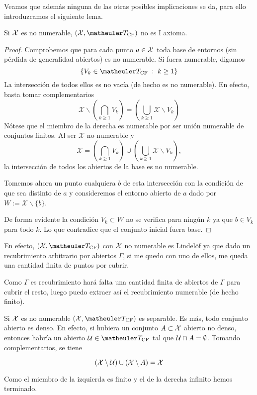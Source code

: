Veamos que además ninguna de las otras posibles implicaciones se da, para ello introduzcamos el siguiente lema.
\begin{lem}[I axioma]
	Si $\mathcal{X}$ es no numerable, $(\X,\T_{\mathrm{CF}})$ no es I axioma.
\end{lem}
\begin{proof}
	Comprobemos que para cada punto $a\in \mathcal{X}$ toda base de entornos (sin pérdida de generalidad abiertos) es no numerable. Si fuera numerable, digamos 
	\[\{V_k \in\T_{\text{CF}}\midc k \geq 1\}\]
	La intersección de todos ellos es no vacía (de hecho es no numerable). En efecto, basta tomar complementarios
	\[\mathcal{X} \backslash \left(\bigcap_{k\geq 1} V_k\right)= \left(\bigcup_{k\geq 1} \mathcal{X} \backslash V_k\right)\]
	Nótese que el miembro de la derecha es numerable por ser unión numerable de conjuntos finitos. Al ser $\mathcal{X}$ no numerable y 
	\[\mathcal{X}= \left(\bigcap_{k\geq 1} V_k\right) \cup \left(\bigcup_{k\geq 1} \mathcal{X}\backslash V_k\right),\]
	la intersección de todos los abiertos de la base es no numerable.
	
	Tomemos ahora un punto cualquiera $b$ de esta intersección con la condición de que sea distinto de $a$ y consideremos el entorno abierto de $a$ dado por $W:=\mathcal{X}\backslash \{b\}$.
	
	De forma evidente la condición $V_k \subset W$ no se verifica para ningún $k$ ya que $b\in V_k$ para todo $k$. Lo que contradice que el conjunto inicial fuera base.
\end{proof}
\begin{obs}
	En efecto, $(\X,\T_{\text{CF}})$ con $\mathcal{X}$ no numerable es Lindelöf ya que dado un recubrimiento arbitrario por abiertos $\Gamma$, si me quedo con uno de ellos, me queda una cantidad finita de puntos por cubrir.
	
	Como $\Gamma$ es recubrimiento hará falta una cantidad finita de abiertos de $\Gamma$ para cubrir el resto, luego puedo extraer así el recubrimiento numerable (de hecho finito).
\end{obs}

\begin{obs}
	Si $\mathcal{X}$ es no numerable $(\X,\T_{\text{CF}})$ es separable. Es más, todo conjunto abierto es denso. En efecto, si hubiera un conjunto $A\subset \mathcal{X}$ abierto no denso, entonces habría un abierto $\U\in \T_{\text{CF}}$ tal que $\mathcal{U}\cap A = \emptyset$. Tomando complementarios, se tiene
	
	\[(\mathcal{X}\setminus \mathcal{U})\cup (\mathcal{X}\setminus A)=\mathcal{X}\]
	
	Como el miembro de la izquierda es finito y el de la derecha infinito hemos terminado.
\end{obs}


